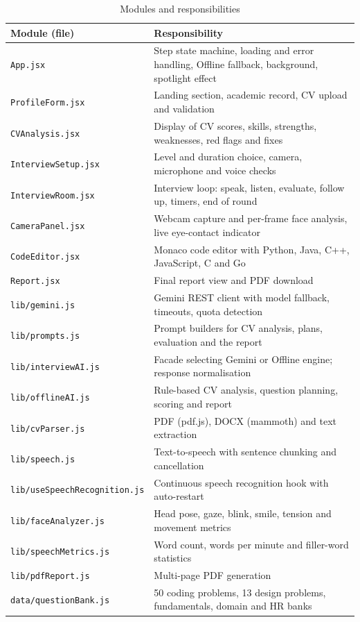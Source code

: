 \documentclass[12pt,a4paper,oneside]{report}
\begin{document}
\begin{table}[H]
\centering
\caption{Modules and responsibilities}
\label{tab:modules}
\small
\begin{tabularx}{\textwidth}{@{}lY@{}}
\toprule
\textbf{Module (file)} & \textbf{Responsibility} \\
\midrule
\texttt{App.jsx} & Step state machine, loading and error handling, Offline fallback, background, spotlight effect \\
\texttt{ProfileForm.jsx} & Landing section, academic record, CV upload and validation \\
\texttt{CVAnalysis.jsx} & Display of CV scores, skills, strengths, weaknesses, red flags and fixes \\
\texttt{InterviewSetup.jsx} & Level and duration choice, camera, microphone and voice checks \\
\texttt{InterviewRoom.jsx} & Interview loop: speak, listen, evaluate, follow up, timers, end of round \\
\texttt{CameraPanel.jsx} & Webcam capture and per-frame face analysis, live eye-contact indicator \\
\texttt{CodeEditor.jsx} & Monaco code editor with Python, Java, C++, JavaScript, C and Go \\
\texttt{Report.jsx} & Final report view and PDF download \\
\texttt{lib/gemini.js} & Gemini REST client with model fallback, timeouts, quota detection \\
\texttt{lib/prompts.js} & Prompt builders for CV analysis, plans, evaluation and the report \\
\texttt{lib/interviewAI.js} & Facade selecting Gemini or Offline engine; response normalisation \\
\texttt{lib/offlineAI.js} & Rule-based CV analysis, question planning, scoring and report \\
\texttt{lib/cvParser.js} & PDF (pdf.js), DOCX (mammoth) and text extraction \\
\texttt{lib/speech.js} & Text-to-speech with sentence chunking and cancellation \\
\texttt{lib/useSpeechRecognition.js} & Continuous speech recognition hook with auto-restart \\
\texttt{lib/faceAnalyzer.js} & Head pose, gaze, blink, smile, tension and movement metrics \\
\texttt{lib/speechMetrics.js} & Word count, words per minute and filler-word statistics \\
\texttt{lib/pdfReport.js} & Multi-page PDF generation \\
\texttt{data/questionBank.js} & 50 coding problems, 13 design problems, fundamentals, domain and HR banks \\
\bottomrule
\end{tabularx}
\end{table}
\end{document}
